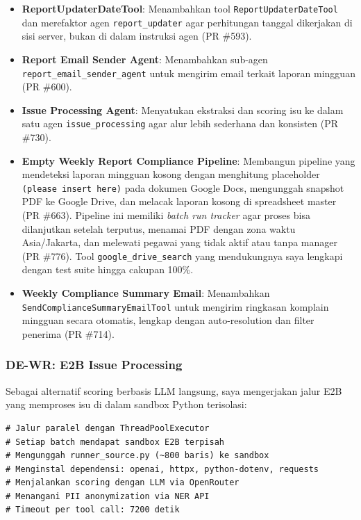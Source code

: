 \begin{itemize}
    \item \textbf{ReportUpdaterDateTool}: Menambahkan tool \texttt{ReportUpdaterDateTool} dan merefaktor agen \texttt{report\_updater} agar perhitungan tanggal dikerjakan di sisi server, bukan di dalam instruksi agen (PR \#593).
    \item \textbf{Report Email Sender Agent}: Menambahkan sub-agen \texttt{report\_email\_sender\_agent} untuk mengirim email terkait laporan mingguan (PR \#600).
    \item \textbf{Issue Processing Agent}: Menyatukan ekstraksi dan scoring isu ke dalam satu agen \texttt{issue\_processing} agar alur lebih sederhana dan konsisten (PR \#730).
    \item \textbf{Empty Weekly Report Compliance Pipeline}: Membangun pipeline yang mendeteksi laporan mingguan kosong dengan menghitung placeholder \texttt{(please insert here)} pada dokumen Google Docs, mengunggah snapshot PDF ke Google Drive, dan melacak laporan kosong di spreadsheet master (PR \#663). Pipeline ini memiliki \textit{batch run tracker} agar proses bisa dilanjutkan setelah terputus, menamai PDF dengan zona waktu Asia/Jakarta, dan melewati pegawai yang tidak aktif atau tanpa manager (PR \#776). Tool \texttt{google\_drive\_search} yang mendukungnya saya lengkapi dengan test suite hingga cakupan 100\%.
    \item \textbf{Weekly Compliance Summary Email}: Menambahkan \texttt{SendComplianceSummaryEmailTool} untuk mengirim ringkasan komplain mingguan secara otomatis, lengkap dengan auto-resolution dan filter penerima (PR \#714).
\end{itemize}

\subsubsection{DE-WR: E2B Issue Processing}

Sebagai alternatif scoring berbasis LLM langsung, saya mengerjakan jalur E2B yang memproses isu di dalam sandbox Python terisolasi:

\begin{lstlisting}[caption={Alur E2B Issue Processing dalam Weekly Report}]
# Jalur paralel dengan ThreadPoolExecutor
# Setiap batch mendapat sandbox E2B terpisah
# Mengunggah runner_source.py (~800 baris) ke sandbox
# Menginstal dependensi: openai, httpx, python-dotenv, requests
# Menjalankan scoring dengan LLM via OpenRouter
# Menangani PII anonymization via NER API
# Timeout per tool call: 7200 detik
\end{lstlisting}

